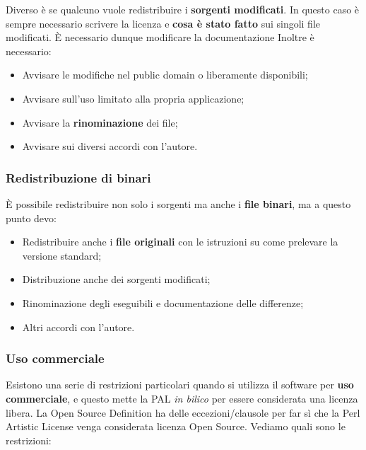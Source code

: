 Diverso è se qualcuno vuole redistribuire i \textbf{sorgenti modificati}. In questo caso è sempre necessario scrivere la licenza e \textbf{cosa è stato fatto} sui singoli file modificati. È necessario dunque modificare la documentazione Inoltre è necessario:

\begin{itemize}

\item Avvisare le modifiche nel public domain o liberamente disponibili;
\item Avvisare sull'uso limitato alla propria applicazione;
\item Avvisare la \textbf{rinominazione} dei file;
\item Avvisare sui diversi accordi con l'autore.

\end{itemize}

\subsubsection{Redistribuzione di binari}

È possibile redistribuire non solo i sorgenti ma anche i \textbf{file binari}, ma a questo punto devo:

\begin{itemize}

\item Redistribuire anche i \textbf{file originali} con le istruzioni su come prelevare la versione standard;
\item Distribuzione anche dei sorgenti modificati;
\item Rinominazione degli eseguibili e documentazione delle differenze;
\item Altri accordi con l'autore.

\end{itemize}

\subsubsection{Uso commerciale}

Esistono una serie di restrizioni particolari quando si utilizza il software per \textbf{uso commerciale}, e questo mette la PAL \textit{in bilico} per essere considerata una licenza libera. La Open Source Definition ha delle eccezioni/clausole per far sì che la Perl Artistic License venga considerata licenza Open Source. Vediamo quali sono le restrizioni:

